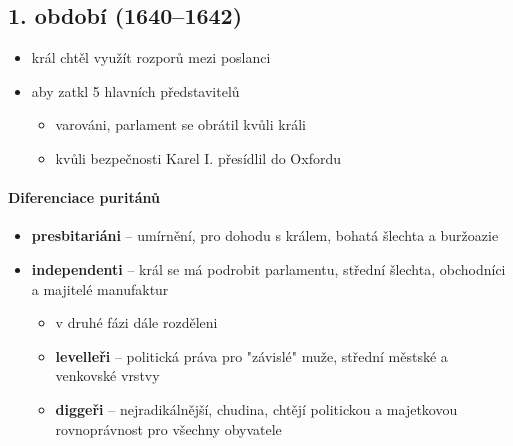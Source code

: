 \subsection{1. období (1640--1642)}
\begin{itemize}
\item král chtěl využít rozporů mezi poslanci
\item {} aby zatkl 5 hlavních představitelů
	\begin{itemize}
	\item varováni, parlament se obrátil kvůli králi
	\item[\ra] kvůli bezpečnosti Karel I. přesídlil do Oxfordu
	\end{itemize}
\end{itemize}

\paragraph{Diferenciace puritánů}
\begin{itemize}
\item \textbf{presbitariáni} -- umírnění, pro dohodu s králem, bohatá šlechta a buržoazie
\item \textbf{independenti} -- král se má podrobit parlamentu, střední šlechta, obchodníci a majitelé manufaktur
	\begin{itemize}
	\item v druhé fázi dále rozděleni
	\item \textbf{levelleři} -- politická práva pro "závislé" muže, střední městské a venkovské vrstvy
	\item \textbf{diggeři} -- nejradikálnější, chudina, chtějí politickou a majetkovou rovnoprávnost pro všechny obyvatele
	\end{itemize}
\end{itemize}


